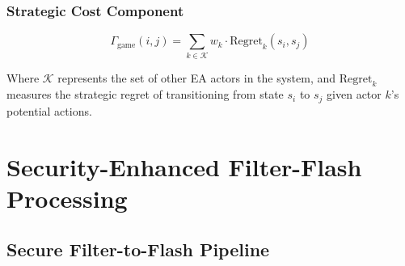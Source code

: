 \documentclass[12pt,a4paper]{article}
\begin{document}
\subsubsection{Strategic Cost Component}

\begin{equation}
\Gamma_{\text{game}}(i,j) = \sum_{k \in \mathcal{K}} w_k \cdot \text{Regret}_k(s_i, s_j)
\end{equation}

Where $\mathcal{K}$ represents the set of other EA actors in the system, and $\text{Regret}_k$ measures the strategic regret of transitioning from state $s_i$ to $s_j$ given actor $k$'s potential actions.

\section{Security-Enhanced Filter-Flash Processing}

\subsection{Secure Filter-to-Flash Pipeline}
\end{document}
